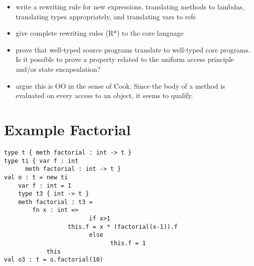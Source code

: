 \begin{itemize}

 \item write a rewriting rule for new expressions, translating methods to lambdas, translating types appropriately, and translating vars to refs
 \item give complete rewriting rules (R*) to the core language
 \item prove that well-typed source programs translate to well-typed core programs.  Is it possible to prove a property related to the uniform access principle and/or state encapsulation?
 \item argue this is OO in the sense of Cook.  Since the body of a method is evaluated on every access to an object, it seems to qualify.
\end{itemize}

\section{Example Factorial}
\begin{lstlisting}
type t { meth factorial : int -> t }
type ti { var f : int
	  meth factorial : int -> t }
val o : t = new ti
	var f : int = 1
	type t3 { int -> t }  
	meth factorial : t3 =
		fn x : int =>
                        if x>1 
			      this.f = x * (factorial(x-1)).f
                        else
                              this.f = 1
			this
val o3 : t = o.factorial(10)
\end{lstlisting}


